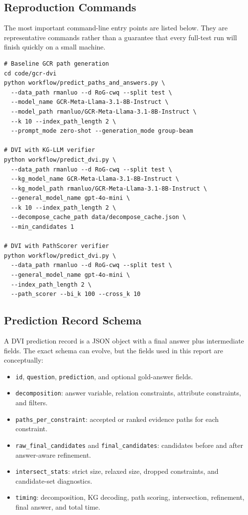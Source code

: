 \documentclass[10pt,twocolumn]{article}
\newcommand{\code}[1]{\texttt{#1}}
\begin{document}
\subsection{Reproduction Commands}
The most important command-line entry points are listed below. They are representative commands rather than a guarantee that every full-test run will finish quickly on a small machine.

\begin{verbatim}
# Baseline GCR path generation
cd code/gcr-dvi
python workflow/predict_paths_and_answers.py \
  --data_path rmanluo --d RoG-cwq --split test \
  --model_name GCR-Meta-Llama-3.1-8B-Instruct \
  --model_path rmanluo/GCR-Meta-Llama-3.1-8B-Instruct \
  --k 10 --index_path_length 2 \
  --prompt_mode zero-shot --generation_mode group-beam

# DVI with KG-LLM verifier
python workflow/predict_dvi.py \
  --data_path rmanluo --d RoG-cwq --split test \
  --kg_model_name GCR-Meta-Llama-3.1-8B-Instruct \
  --kg_model_path rmanluo/GCR-Meta-Llama-3.1-8B-Instruct \
  --general_model_name gpt-4o-mini \
  --k 10 --index_path_length 2 \
  --decompose_cache_path data/decompose_cache.json \
  --min_candidates 1

# DVI with PathScorer verifier
python workflow/predict_dvi.py \
  --data_path rmanluo --d RoG-cwq --split test \
  --general_model_name gpt-4o-mini \
  --index_path_length 2 \
  --path_scorer --bi_k 100 --cross_k 10
\end{verbatim}

\subsection{Prediction Record Schema}
A DVI prediction record is a JSON object with a final answer plus intermediate fields. The exact schema can evolve, but the fields used in this report are conceptually:

\begin{itemize}
  \item \code{id}, \code{question}, \code{prediction}, and optional gold-answer fields.
  \item \code{decomposition}: answer variable, relation constraints, attribute constraints, and filters.
  \item \code{paths\_per\_constraint}: accepted or ranked evidence paths for each constraint.
  \item \code{raw\_final\_candidates} and \code{final\_candidates}: candidates before and after answer-aware refinement.
  \item \code{intersect\_stats}: strict size, relaxed size, dropped constraints, and candidate-set diagnostics.
  \item \code{timing}: decomposition, KG decoding, path scoring, intersection, refinement, final answer, and total time.
\end{itemize}
\end{document}
